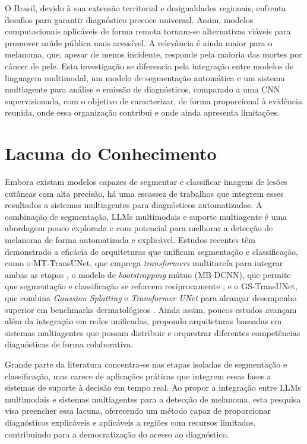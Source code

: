 O Brasil, devido à sua extensão territorial e desigualdades regionais, enfrenta desafios para garantir diagnóstico precoce universal. Assim, modelos computacionais aplicáveis de forma remota tornam-se alternativas viáveis para promover saúde pública mais acessível. A relevância é ainda maior para o melanoma, que, apesar de menos incidente, responde pela maioria das mortes por câncer de pele. Esta investigação se diferencia pela integração entre modelos de linguagem multimodal, um modelo de segmentação automática e um sistema multiagente para análise e emissão de diagnósticos, comparado a uma CNN supervisionada, com o objetivo de caracterizar, de forma proporcional à evidência reunida, onde essa organização contribui e onde ainda apresenta limitações.

\section{Lacuna do Conhecimento}

Embora existam modelos capazes de segmentar e classificar imagens de lesões cutâneas com alta precisão, há uma escassez de trabalhos que integrem esses resultados a sistemas multiagentes para diagnósticos automatizados. A combinação de segmentação, LLMs multimodais e suporte multiagente é uma abordagem pouco explorada e com potencial para melhorar a detecção de melanoma de forma automatizada e explicável. Estudos recentes têm demonstrado a eficácia de arquiteturas que unificam segmentação e classificação, como o MT-TransUNet, que emprega \textit{transformers} multitarefa para integrar ambas as etapas \cite{chen2021mt-transunet}, o modelo de \textit{bootstrapping} mútuo (MB-DCNN), que permite que segmentação e classificação se reforcem reciprocamente \cite{xia_mutual_bootstrapping_2019}, e o GS-TransUNet, que combina \textit{Gaussian Splatting} e \textit{Transformer UNet} para alcançar desempenho superior em benchmarks dermatológicos \cite{anand2025gs-transunet}. Ainda assim, poucos estudos avançam além da integração em redes unificadas, propondo arquiteturas baseadas em sistemas multiagentes que possam distribuir e orquestrar diferentes competências diagnósticas de forma colaborativa.


Grande parte da literatura concentra-se nas etapas isoladas de segmentação e classificação, mas carece de aplicações práticas que integrem essas fases a sistemas de suporte à decisão em tempo real. Ao propor a integração entre LLMs multimodais e sistemas multiagentes para a detecção de melanoma, esta pesquisa visa preencher essa lacuna, oferecendo um método capaz de proporcionar diagnósticos explicáveis e aplicáveis a regiões com recursos limitados, contribuindo para a democratização do acesso ao diagnóstico.

